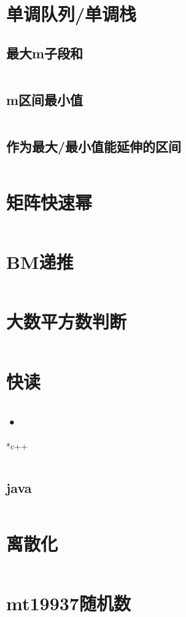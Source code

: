 \documentclass[a4paper,11pt]{article}
\begin{document}
\section*{单调队列/单调栈}
\subsection*{最大m子段和}
\inputminted[]{c++}{Template/Other/MonotonicQueueI.cpp}
\subsection*{m区间最小值}
\inputminted[]{c++}{Template/Other/MonotonicQueueII.cpp}
\subsection*{作为最大/最小值能延伸的区间}
\inputminted[]{c++}{Template/Other/MonotonicQueueIII.cpp}

\section*{矩阵快速幂}
\inputminted[]{c++}{Template/Other/FastMat.cpp}
\section*{BM递推}
\inputminted[]{c++}{Template/Other/BM.cpp}
\section*{大数平方数判断}
\inputminted[]{java}{Template/Other/IsSquare.java}
\section*{快读}
\subsection*{•}*{c++}
\inputminted[]{c++}{Template/Other/fread.cpp}
\subsection*{java}
\inputminted[]{java}{Template/Other/fScan.java}
\section*{离散化}
\inputminted[]{c++}{Template/Other/Discretization.cpp}
\section*{mt19937随机数}
\inputminted[]{c++}{Template/Other/mt19937.cpp}
\end{document}
